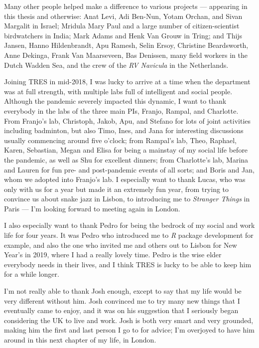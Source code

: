 Many other people helped make a difference to various projects --- appearing in this thesis and otherwise: Anat Levi, Adi Ben-Nun, Yotam Orchan, and Sivan Margalit in Israel; Mridula Mary Paul and a large number of citizen-scientist birdwatchers in India; Mark Adams and Henk Van Grouw in Tring; and Thijs Jansen, Hanno Hildenbrandt, Apu Ramesh, Selin Ersoy, Christine Beardsworth, Anne Dekinga, Frank Van Maarseveen, Bas Denissen, many field workers in the Dutch Wadden Sea, and the crew of the \textit{RV Navicula} in the Netherlands.

\medskip

Joining TRES in mid-2018, I was lucky to arrive at a time when the department was at full strength, with multiple labs full of intelligent and social people.
Although the pandemic severely impacted this dynamic, I want to thank everybody in the labs of the three main PIs, Franjo, Rampal, and Charlotte.
From Franjo's lab, Christoph, Jakob, Apu, and Stefano for lots of joint activities including badminton, but also Timo, Ines, and Jana for interesting discussions usually commencing around five o'clock;
from Rampal's lab, Theo, Raphael, Karen, Sebastian, Megan and Elisa for being a mainstay of my social life before the pandemic, as well as Shu for excellent dinners;
from Charlotte's lab, Marina and Lauren for fun pre- and post-pandemic events of all sorts;
and Boris and Jan, whom we adopted into Franjo's lab.
I especially want to thank Lucas, who was only with us for a year but made it an extremely fun year, from trying to convince us about snake jazz in Lisbon, to introducing me to \textit{Stranger Things} in Paris --- I'm looking forward to meeting again in London.

I also especially want to thank Pedro for being the bedrock of my social and work life for four years.
It was Pedro who introduced me to \textit{R} package development for example, and also the one who invited me and others out to Lisbon for New Year's in 2019, where I had a really lovely time.
Pedro is the wise elder everybody needs in their lives, and I think TRES is lucky to be able to keep him for a while longer.

I'm not really able to thank Josh enough, except to say that my life would be very different without him.
Josh convinced me to try many new things that I eventually came to enjoy, and it was on his suggestion that I seriously began considering the UK to live and work.
Josh is both very smart and very grounded, making him the first and last person I go to for advice; I'm overjoyed to have him around in this next chapter of my life, in London.

